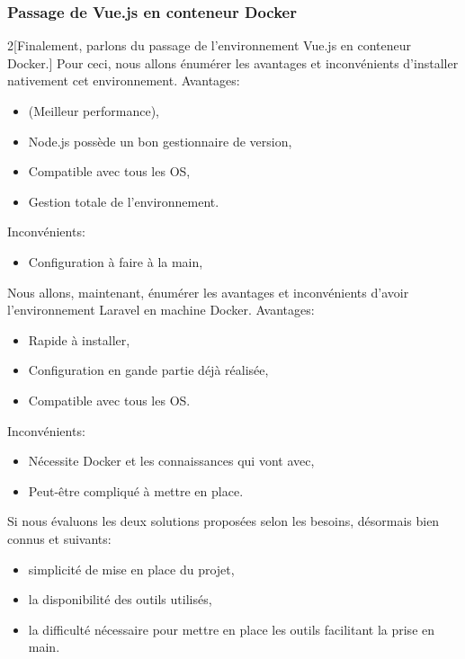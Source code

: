 \documentclass[
    iai, %
    il, %
]{heig-tb}
\begin{document}
\subsubsection{Passage de Vue.js en conteneur Docker}
\begin{multicols}{2}[Finalement, parlons du passage de l'environnement Vue.js en conteneur Docker.]
    Pour ceci, nous allons énumérer les avantages et inconvénients d'installer nativement cet environnement.
    Avantages:
    \begin{itemize}
        \item (Meilleur performance),
        \item Node.js possède un bon gestionnaire de version,
        \item Compatible avec tous les OS,
        \item Gestion totale de l'environnement.
    \end{itemize}

    Inconvénients:
    \begin{itemize}
        \item Configuration à faire à la main,
    \end{itemize}

    \columnbreak
    Nous allons, maintenant, énumérer les avantages et inconvénients d'avoir l'environnement Laravel en machine Docker.
    Avantages:
    \begin{itemize}
        \item Rapide à installer,
        \item Configuration en gande partie déjà réalisée,
        \item Compatible avec tous les OS.
    \end{itemize}

    Inconvénients:
    \begin{itemize}
        \item Nécessite Docker et les connaissances qui vont avec,
        \item Peut-être compliqué à mettre en place.
    \end{itemize}
\end{multicols}

Si nous évaluons les deux solutions proposées selon les besoins, désormais bien connus et suivants:
\begin{itemize}
    \item simplicité de mise en place du projet,
    \item la disponibilité des outils utilisés,
    \item la difficulté nécessaire pour mettre en place les outils facilitant la prise en main.
\end{itemize}
\end{document}

